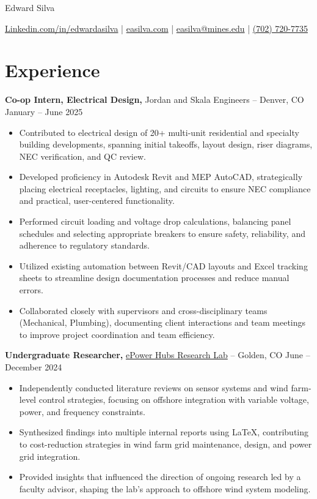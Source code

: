 \documentclass[11pt]{article}       %
\begin{document}
\centerline{\huge Edward Silva}
\vspace{5pt}

\centerline{
\href{https://www.linkedin.com/in/edwardasilva/}{Linkedin.com/in/edwardasilva}
| \href{https://easilva.com}{easilva.com}
| \href{mailto:easilva@mines.edu}{easilva@mines.edu} 
| \href{tel:7027207735}{(702) 720-7735}
}

\vspace{-14pt}
\section*{Experience}
\vspace{5pt}
\textbf{Co-op Intern, Electrical Design, }{Jordan and Skala Engineers} -- Denver, CO \hfill January -- June 2025 \\
\vspace{-6.5pt}
\begin{itemize}
  \item Contributed to electrical design of 20+ multi-unit residential and specialty building developments, spanning initial takeoffs, layout design, riser diagrams, NEC verification, and QC review.
  \item Developed proficiency in Autodesk Revit and MEP AutoCAD, strategically placing electrical receptacles, lighting, and circuits to ensure NEC compliance and practical, user-centered functionality.
  \item Performed circuit loading and voltage drop calculations, balancing panel schedules and selecting appropriate breakers to ensure safety, reliability, and adherence to regulatory standards.
  \item Utilized existing automation between Revit/CAD layouts and Excel tracking sheets to streamline design documentation processes and reduce manual errors.
  \item Collaborated closely with supervisors and cross-disciplinary teams (Mechanical, Plumbing), documenting client interactions and team meetings to improve project coordination and team efficiency.
\end{itemize}

\textbf{Undergraduate Researcher, }{\href{https://www.epowerhubs.com/home}{ePower Hubs Research Lab}} -- Golden, CO \hfill June -- December 2024 \\
\vspace{-6.5pt}
\begin{itemize}
  \item Independently conducted literature reviews on sensor systems and wind farm-level control strategies, focusing on offshore integration with variable voltage, power, and frequency constraints.
  \item Synthesized findings into multiple internal reports using LaTeX, contributing to cost-reduction strategies in wind farm grid maintenance, design, and power grid integration.
  \item Provided insights that influenced the direction of ongoing research led by a faculty advisor, shaping the lab's approach to offshore wind system modeling.
\end{itemize}
\end{document}
